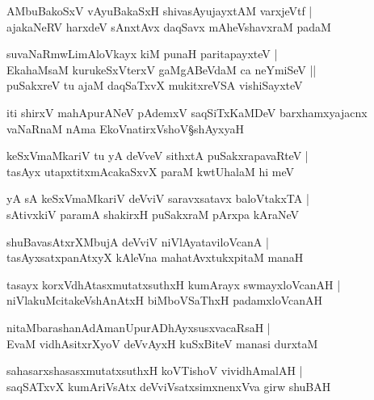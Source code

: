 \begin{shloka}
AMbuBakoSxV vAyuBakaSxH shivasAyujayxtAM varxjeVtf |\\
ajakaNeRV harxdeV sAnxtAvx daqSavx mAheVshavxraM padaM 
\end{shloka}

\begin{shloka}
suvaNaRmwLimAloVkayx kiM punaH paritapayxteV |\\
EkahaMsaM kurukeSxVterxV gaMgABeVdaM ca neYmiSeV ||\\
puSakxreV tu ajaM daqSaTxvX mukitxreVSA vishiSayxteV
\end{shloka}
iti shirxV mahApurANeV pAdemxV saqSiTxKaMDeV barxhamxyajacnx vaNaRnaM nAma EkoVnatirxVshoV\S shAyxyaH 

\setcounter{shloka}{0}
\begin{shloka}
keSxVmaMkariV tu yA deVveV sithxtA puSakxrapavaRteV |\\
tasAyx utapxtitxmAcakaSxvX paraM kwtUhalaM hi meV 
\end{shloka}

\begin{shloka}
yA sA keSxVmaMkariV deVviV saravxsatavx baloVtakxTA |\\
sAtivxkiV paramA shakirxH puSakxraM pArxpa kAraNeV 
\end{shloka}

\begin{shloka}
shuBavasAtxrXMbujA deVviV niVlAyataviloVcanA |\\
tasAyxsatxpanAtxyX kAleVna mahatAvxtukxpitaM manaH 
\end{shloka}

\begin{shloka}
tasayx korxVdhAtasxmutatxsuthxH kumArayx swmayxloVcanAH |\\
niVlakuMcitakeVshAnAtxH biMboVSaThxH padamxloVcanAH 
\end{shloka}

\begin{shloka}
nitaMbarashanAdAmanUpurADhAyxsusxvacaRsaH |\\
EvaM vidhAsitxrXyoV deVvAyxH kuSxBiteV manasi durxtaM 
\end{shloka}

\begin{shloka}
sahasarxshasasxmutatxsuthxH koVTishoV vividhAmalAH |\\
saqSATxvX kumAriVsAtx deVviVsatxsimxnenxVva girw shuBAH
\end{shloka}

